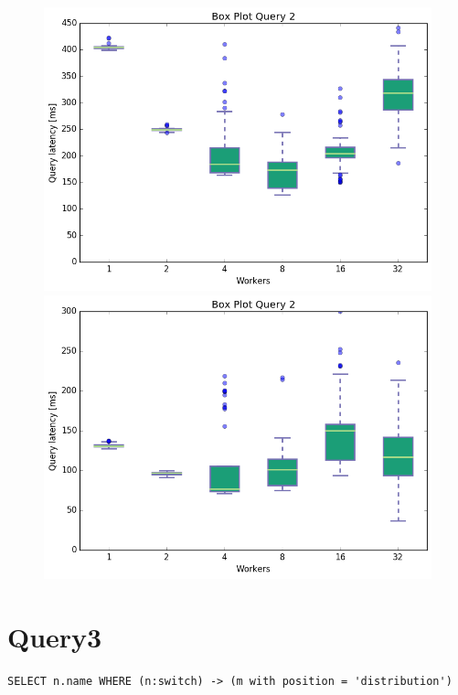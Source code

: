 \documentclass[11pt,singlecolumn]{scrartcl}
\begin{document}
\begin{figure}[!tbp]
  \centering
  \RawFloats
  \begin{minipage}[b]{0.5\textwidth}
    \includegraphics[width=\textwidth]{boxesjl/q2}
  \end{minipage}
  \hfill
  \begin{minipage}[b]{0.5\textwidth}
    \includegraphics[width=\textwidth]{boxesjs/q2}
  \end{minipage}
\end{figure}
\clearpage
\section{Query3}
\begin{verbatim}
SELECT n.name WHERE (n:switch) -> (m with position = 'distribution')\end{verbatim}
\end{document}
